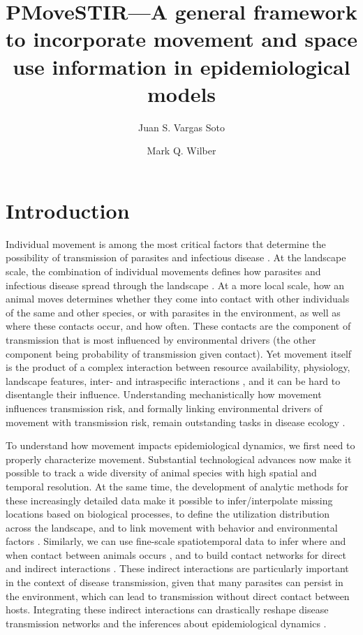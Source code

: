 \documentclass[letterpaper]{article}
\title{PMoveSTIR---A general framework to incorporate movement and space use information in epidemiological models}
\author{Juan S. Vargas Soto \and Mark Q. Wilber}
\affil{School of Natural Resources, University of Tennessee, Knoxville, TN}
\date{}
\begin{document}
\maketitle

\linenumbers
\doublespacing

\section*{Introduction}

Individual movement is among the most critical factors that determine the possibility of transmission of parasites and infectious disease \citep{Manlove2022,Dougherty2022}. At the landscape scale, the combination of individual movements defines how parasites and infectious disease spread through the landscape \citep{Fofana2017}. At a more local scale, how an animal moves determines whether they come into contact with other individuals of the same and other species, or with parasites in the environment, as well as where these contacts occur, and how often. These contacts are the component of transmission that is most influenced by environmental drivers (the other component being probability of transmission given contact). Yet movement itself is the product of a complex interaction between resource availability, physiology, landscape features, inter- and intraspecific interactions \citep{Nathan2008,Merkle2018,Vanderwaal2017}, and it can be hard to disentangle their influence. Understanding mechanistically how movement influences transmission risk, and formally linking environmental drivers of movement with transmission risk, remain outstanding tasks in disease ecology \citep{White2018}. 

To understand how movement impacts epidemiological dynamics, we first need to properly characterize movement. Substantial technological advances now make it possible to track a wide diversity of animal species with high spatial and temporal resolution. At the same time, the development of analytic methods for these increasingly detailed data make it possible to infer/interpolate missing locations based on biological processes, to define the utilization distribution across the landscape, and to link movement with behavior and environmental factors \citep{Signer2017,Hooten2017,Avgar2015}. Similarly, we can use fine-scale spatiotemporal data to infer where and when contact between animals occurs \citep{Noonan2021}, and to build contact networks for direct \citep{Craft2015} and indirect interactions \citep{Yang2023}. These indirect interactions are particularly important in the context of disease transmission, given that many parasites can persist in the environment, which can lead to transmission without direct contact between hosts. Integrating these indirect interactions can drastically reshape disease transmission networks and the inferences about epidemiological dynamics \citep{Wilber2022,Richardson2015}. 
\end{document}
